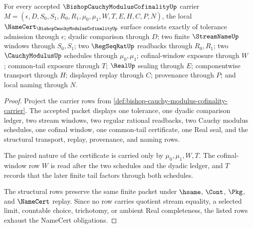 \begin{theorem}
\label{thm:bishop-cauchy-modulus-cofinality-namecert-obligations}
For every accepted $\BishopCauchyModulusCofinalityUp$ carrier $M=(\epsilon,D,S_0,S_1,R_0,R_1,\mu_0,\mu_1,W,T,E,H,C,P,N)$, the local $\NameCert_{\BishopCauchyModulusCofinalityUp}$ surface consists exactly of tolerance admission through $\epsilon$; dyadic comparison through $D$; two finite $\StreamNameUp$ windows through $S_0,S_1$; two $\RegSeqRatUp$ readbacks through $R_0,R_1$; two $\CauchyModulusUp$ schedules through $\mu_0,\mu_1$; cofinal-window exposure through $W$; common-tail exposure through $T$; $\RealUp$ sealing through $E$; componentwise transport through $H$; displayed replay through $C$; provenance through $P$; and local naming through $N$.
\end{theorem}
\begin{proof}
Project the carrier rows from \autoref{def:bishop-cauchy-modulus-cofinality-carrier}. The accepted packet displays one tolerance, one dyadic comparison ledger, two stream windows, two regular rational readbacks, two Cauchy modulus schedules, one cofinal window, one common-tail certificate, one Real seal, and the structural transport, replay, provenance, and naming rows.

The paired nature of the certificate is carried only by $\mu_0,\mu_1,W,T$. The cofinal-window row $W$ is read after the two schedules and the dyadic ledger, and $T$ records that the later finite tail factors through both schedules.

The structural rows preserve the same finite packet under $\hsame$, $\Cont$, $\Pkg$, and $\NameCert$ replay. Since no row carries quotient stream equality, a selected limit, countable choice, trichotomy, or ambient Real completeness, the listed rows exhaust the NameCert obligations.
\end{proof}

